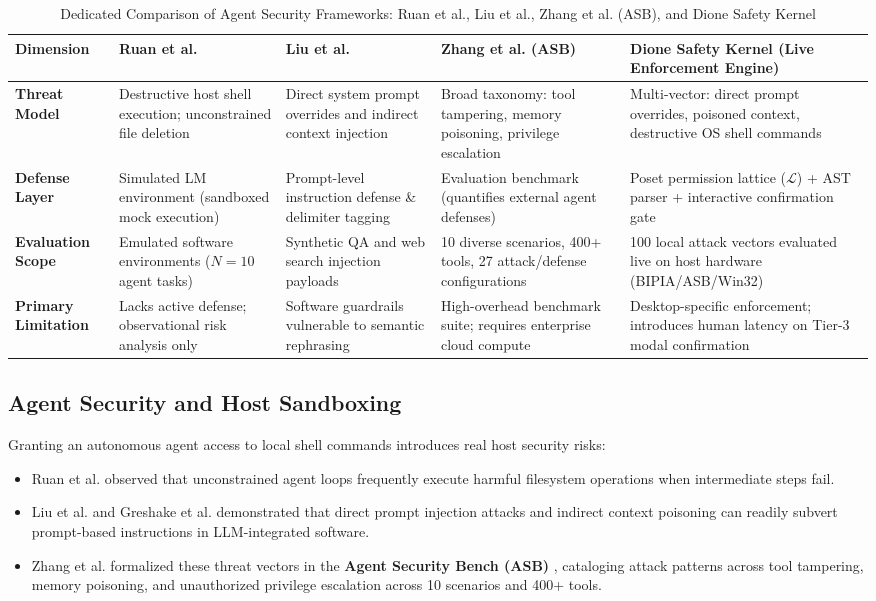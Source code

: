 \documentclass[conference,a4paper]{IEEEtran}
\begin{document}
\begin{table}[!t]
\caption{Dedicated Comparison of Agent Security Frameworks: Ruan et al., Liu et al., Zhang et al. (ASB), and Dione Safety Kernel}
\label{tab:security_comparison}
\centering
\begin{tabularx}{\textwidth}{lXXXX}
\toprule
\textbf{Dimension} & \textbf{Ruan et al. \cite{ruan2023identifying}} & \textbf{Liu et al. \cite{liu2023prompt}} & \textbf{Zhang et al. (ASB) \cite{zhang2024agent}} & \textbf{Dione Safety Kernel (Live Enforcement Engine)} \\
\midrule
\textbf{Threat Model} & Destructive host shell execution; unconstrained file deletion & Direct system prompt overrides and indirect context injection & Broad taxonomy: tool tampering, memory poisoning, privilege escalation & Multi-vector: direct prompt overrides, poisoned context, destructive OS shell commands \\
\textbf{Defense Layer} & Simulated LM environment (sandboxed mock execution) & Prompt-level instruction defense \& delimiter tagging & Evaluation benchmark (quantifies external agent defenses) & Poset permission lattice ($\mathcal{L}$) + AST parser + interactive confirmation gate \\
\textbf{Evaluation Scope} & Emulated software environments ($N=10$ agent tasks) & Synthetic QA and web search injection payloads & 10 diverse scenarios, 400+ tools, 27 attack/defense configurations & 100 local attack vectors evaluated live on host hardware (BIPIA/ASB/Win32) \\
\textbf{Primary Limitation} & Lacks active defense; observational risk analysis only & Software guardrails vulnerable to semantic rephrasing & High-overhead benchmark suite; requires enterprise cloud compute & Desktop-specific enforcement; introduces human latency on Tier-3 modal confirmation \\
\bottomrule
\end{tabularx}
\end{table}

\subsection{Agent Security and Host Sandboxing}
Granting an autonomous agent access to local shell commands introduces real host security risks:
\begin{itemize}
    \item Ruan et al. \cite{ruan2023identifying} observed that unconstrained agent loops frequently execute harmful filesystem operations when intermediate steps fail.
    \item Liu et al. \cite{liu2023prompt} and Greshake et al. \cite{greshake2023not} demonstrated that direct prompt injection attacks and indirect context poisoning can readily subvert prompt-based instructions in LLM-integrated software.
    \item Zhang et al. formalized these threat vectors in the \textbf{Agent Security Bench (ASB)} \cite{zhang2024agent}, cataloging attack patterns across tool tampering, memory poisoning, and unauthorized privilege escalation across 10 scenarios and 400+ tools.
\end{itemize}
\end{document}
